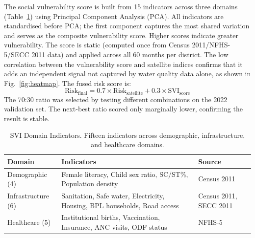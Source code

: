 \documentclass[conference]{IEEEtran}
\begin{document}
The social vulnerability score is built from 15 indicators across three
domains (Table~\ref{tab:svi}) using Principal Component Analysis (PCA).
All indicators are standardised before PCA; the first component captures
the most shared variation and serves as the composite vulnerability score.
Higher scores indicate greater vulnerability. The score is static
(computed once from Census 2011/NFHS-5/SECC 2011 data) and applied
across all 60 months per district. The low correlation between the
vulnerability score and satellite indices confirms that it adds an
independent signal not captured by water quality data alone, as shown
in Fig.~\ref{fig:heatmap}. The fused
risk score is:
\begin{equation}
\text{Risk}_{\text{final}} = 0.7 \times \text{Risk}_{\text{satellite}}
                           + 0.3 \times \text{SVI}_{\text{score}}
\label{eq:fusion}
\end{equation}
The 70:30 ratio was selected by testing different combinations on the
2022 validation set. The next-best ratio scored only marginally lower,
confirming the result is stable.

\begin{table}[!t]
\caption{SVI Domain Indicators. Fifteen indicators across demographic, infrastructure, and healthcare domains.}
\label{tab:svi}
\centering
\renewcommand{\arraystretch}{1.1}
\begin{tabular}{|p{1.3cm}|p{3.4cm}|p{1.6cm}|}
\hline
\textbf{Domain} & \textbf{Indicators} & \textbf{Source} \\
\hline
Demographic (4) & Female literacy, Child sex ratio, SC/ST\%, Population density & Census 2011 \\
\hline
Infrastructure (6) & Sanitation, Safe water, Electricity, Housing, BPL households, Road access & Census 2011, SECC 2011 \\
\hline
Healthcare (5) & Institutional births, Vaccination, Insurance, ANC visits, ODF status & NFHS-5 \\
\hline
\end{tabular}
\end{table}
\end{document}
